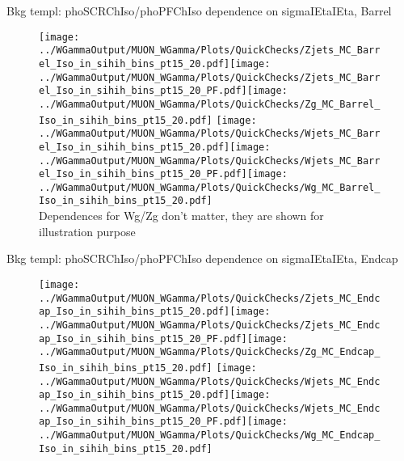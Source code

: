 \documentclass{beamer}
\begin{document}
\begin{frame}{Bkg templ: phoSCRChIso/phoPFChIso dependence on sigmaIEtaIEta, Barrel}
  \begin{figure}
    \centering
    \texttt{[image: ../WGammaOutput/MUON\_WGamma/Plots/QuickChecks/Zjets\_MC\_Barrel\_Iso\_in\_sihih\_bins\_pt15\_20.pdf]}\texttt{[image: ../WGammaOutput/MUON\_WGamma/Plots/QuickChecks/Zjets\_MC\_Barrel\_Iso\_in\_sihih\_bins\_pt15\_20\_PF.pdf]}\texttt{[image: ../WGammaOutput/MUON\_WGamma/Plots/QuickChecks/Zg\_MC\_Barrel\_Iso\_in\_sihih\_bins\_pt15\_20.pdf]}
    \texttt{[image: ../WGammaOutput/MUON\_WGamma/Plots/QuickChecks/Wjets\_MC\_Barrel\_Iso\_in\_sihih\_bins\_pt15\_20.pdf]}\texttt{[image: ../WGammaOutput/MUON\_WGamma/Plots/QuickChecks/Wjets\_MC\_Barrel\_Iso\_in\_sihih\_bins\_pt15\_20\_PF.pdf]}\texttt{[image: ../WGammaOutput/MUON\_WGamma/Plots/QuickChecks/Wg\_MC\_Barrel\_Iso\_in\_sihih\_bins\_pt15\_20.pdf]}
    \\Dependences for Wg/Zg don't matter, they are shown for illustration purpose
  \end{figure}
\end{frame}

\begin{frame}{Bkg templ: phoSCRChIso/phoPFChIso dependence on sigmaIEtaIEta, Endcap}
  \begin{figure}
    \centering
    \texttt{[image: ../WGammaOutput/MUON\_WGamma/Plots/QuickChecks/Zjets\_MC\_Endcap\_Iso\_in\_sihih\_bins\_pt15\_20.pdf]}\texttt{[image: ../WGammaOutput/MUON\_WGamma/Plots/QuickChecks/Zjets\_MC\_Endcap\_Iso\_in\_sihih\_bins\_pt15\_20\_PF.pdf]}\texttt{[image: ../WGammaOutput/MUON\_WGamma/Plots/QuickChecks/Zg\_MC\_Endcap\_Iso\_in\_sihih\_bins\_pt15\_20.pdf]}
    \texttt{[image: ../WGammaOutput/MUON\_WGamma/Plots/QuickChecks/Wjets\_MC\_Endcap\_Iso\_in\_sihih\_bins\_pt15\_20.pdf]}\texttt{[image: ../WGammaOutput/MUON\_WGamma/Plots/QuickChecks/Wjets\_MC\_Endcap\_Iso\_in\_sihih\_bins\_pt15\_20\_PF.pdf]}\texttt{[image: ../WGammaOutput/MUON\_WGamma/Plots/QuickChecks/Wg\_MC\_Endcap\_Iso\_in\_sihih\_bins\_pt15\_20.pdf]}
  \end{figure}
\end{frame}
\end{document}
